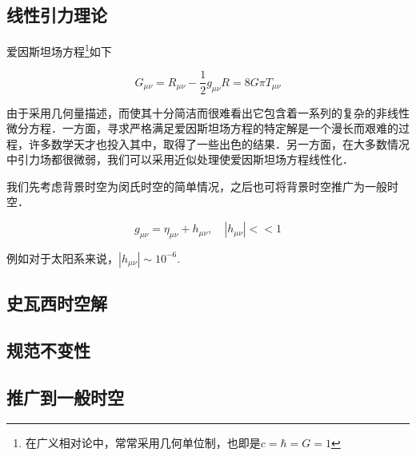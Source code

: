 
\begin{issues}
\issueMissDepend
\issueDraft
\end{issues}



\subsection{线性引力理论}
爱因斯坦场方程\footnote{在广义相对论中，常常采用几何单位制，也即是$c=\hbar=G=1$}如下

\begin{equation}
G_{\mu \nu} = R_{\mu \nu} - \frac{1}{2}g_{\mu\nu}R = 8 G\pi T_{\mu\nu}
\end{equation}

由于采用几何量描述，而使其十分简洁而很难看出它包含着一系列的复杂的非线性微分方程．一方面，寻求严格满足爱因斯坦场方程的特定解是一个漫长而艰难的过程，许多数学天才也投入其中，取得了一些出色的结果．另一方面，在大多数情况中引力场都很微弱，我们可以采用近似处理使爱因斯坦场方程线性化．



我们先考虑背景时空为闵氏时空的简单情况，之后也可将背景时空推广为一般时空．

\begin{equation}
g_{\mu\nu} = \eta_{\mu\nu} + h_{\mu\nu},\quad |h_{\mu\nu}|<<1
\end{equation}

例如对于太阳系来说，$|h_{\mu\nu}| \sim 10^{-6}$.


\subsection{史瓦西时空解}




\subsection{规范不变性}


\subsection{推广到一般时空}

